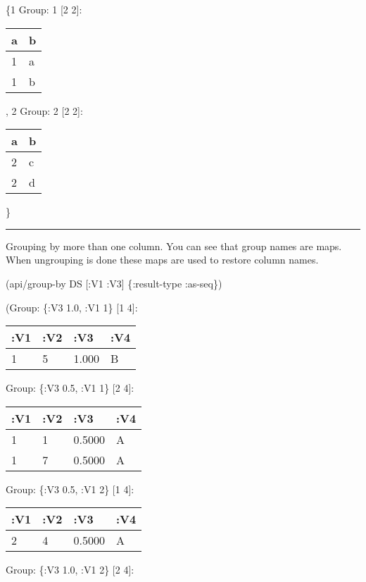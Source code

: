 \documentclass[]{article}
\newenvironment{Shaded}{\begin{snugshade}}{\end{snugshade}}
\newcommand{\AttributeTok}[1]{\textcolor[rgb]{0.77,0.63,0.00}{#1}}
\newcommand{\NormalTok}[1]{#1}
\begin{document}
\{1 Group: 1 {[}2 2{]}:

\begin{longtable}[]{@{}ll@{}}
\toprule
a & b\tabularnewline
\midrule
\endhead
1 & a\tabularnewline
1 & b\tabularnewline
\bottomrule
\end{longtable}

, 2 Group: 2 {[}2 2{]}:

\begin{longtable}[]{@{}ll@{}}
\toprule
a & b\tabularnewline
\midrule
\endhead
2 & c\tabularnewline
2 & d\tabularnewline
\bottomrule
\end{longtable}

\}

\begin{center}\rule{0.5\linewidth}{0.5pt}\end{center}

Grouping by more than one column. You can see that group names are maps.
When ungrouping is done these maps are used to restore column names.

\begin{Shaded}
\begin{Highlighting}[]
\NormalTok{(api/group-by DS [}\AttributeTok{:V1} \AttributeTok{:V3}\NormalTok{] \{}\AttributeTok{:result-type} \AttributeTok{:as-seq}\NormalTok{\})}
\end{Highlighting}
\end{Shaded}

(Group: \{:V3 1.0, :V1 1\} {[}1 4{]}:

\begin{longtable}[]{@{}llll@{}}
\toprule
:V1 & :V2 & :V3 & :V4\tabularnewline
\midrule
\endhead
1 & 5 & 1.000 & B\tabularnewline
\bottomrule
\end{longtable}

Group: \{:V3 0.5, :V1 1\} {[}2 4{]}:

\begin{longtable}[]{@{}llll@{}}
\toprule
:V1 & :V2 & :V3 & :V4\tabularnewline
\midrule
\endhead
1 & 1 & 0.5000 & A\tabularnewline
1 & 7 & 0.5000 & A\tabularnewline
\bottomrule
\end{longtable}

Group: \{:V3 0.5, :V1 2\} {[}1 4{]}:

\begin{longtable}[]{@{}llll@{}}
\toprule
:V1 & :V2 & :V3 & :V4\tabularnewline
\midrule
\endhead
2 & 4 & 0.5000 & A\tabularnewline
\bottomrule
\end{longtable}

Group: \{:V3 1.0, :V1 2\} {[}2 4{]}:
\end{document}
